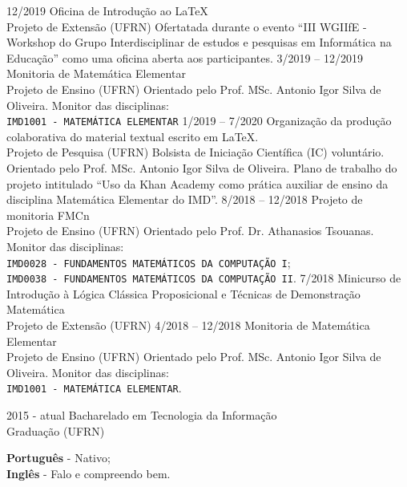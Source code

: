 \documentclass[9pt]{developercv}
\begin{document}
	\begin{entrylist}
		\entry
			{12/2019}
			{Oficina de Introdução ao \LaTeX{}\\
				\footnotesize{{Projeto de Extensão}}}
			{(UFRN)}
			{Ofertatada durante o evento ``III WGIIfE - Workshop do Grupo Interdisciplinar de estudos e pesquisas em Informática na Educação'' como uma oficina aberta aos participantes.}
		\entry
			{3/2019 -- 12/2019}
			{Monitoria de Matemática Elementar\\
				\footnotesize{Projeto de Ensino}}
			{(UFRN)}
			{Orientado pelo Prof. MSc. Antonio Igor Silva de Oliveira. Monitor das disciplinas:\\
				\texttt{IMD1001 - MATEMÁTICA ELEMENTAR}}
		\entry
			{1/2019 -- 7/2020}
			{Organização da produção colaborativa do material textual escrito em \LaTeX{}.\\
				\footnotesize{Projeto de Pesquisa}}
			{(UFRN)}
            {Bolsista de Iniciação Científica (IC) voluntário. Orientado pelo Prof. MSc. Antonio Igor Silva de Oliveira. Plano de trabalho do projeto intitulado ``Uso da Khan Academy como prática auxiliar de ensino da disciplina Matemática Elementar do IMD''.}
		\entry
			{8/2018 -- 12/2018}
			{Projeto de monitoria FMCn\\
				\footnotesize{Projeto de Ensino}}
			{(UFRN)}
			{Orientado pelo Prof. Dr. Athanasios Tsouanas. Monitor das disciplinas:\\
				\texttt{IMD0028 - FUNDAMENTOS MATEMÁTICOS DA COMPUTAÇÃO I};\\
				\texttt{IMD0038 - FUNDAMENTOS MATEMÁTICOS DA COMPUTAÇÃO II}.}
		\entry
			{7/2018}
			{Minicurso de Introdução à Lógica Clássica Proposicional e Técnicas de Demonstração Matemática\\
				\footnotesize{{Projeto de Extensão}}}
			{(UFRN)}
			{}
		\entry
			{4/2018 -- 12/2018}
			{Monitoria de Matemática Elementar\\
				\footnotesize{Projeto de Ensino}}
			{(UFRN)}
			{Orientado pelo Prof. MSc. Antonio Igor Silva de Oliveira. Monitor das disciplinas:\\
				\texttt{IMD1001 - MATEMÁTICA ELEMENTAR}.}
	\end{entrylist}


	\cvsect{Formação Acadêmica}
	\begin{entrylist}
		\entry
			{2015 - atual}
			{Bacharelado em Tecnologia da Informação\\
				\footnotesize{Graduação}}
			{(UFRN)}
			{}
	\end{entrylist}


	\begin{minipage}[t]{1\textwidth}
		\textbf{Português} - Nativo;\\
		\textbf{Inglês} - Falo e compreendo bem.
	\end{minipage}
\end{document}
